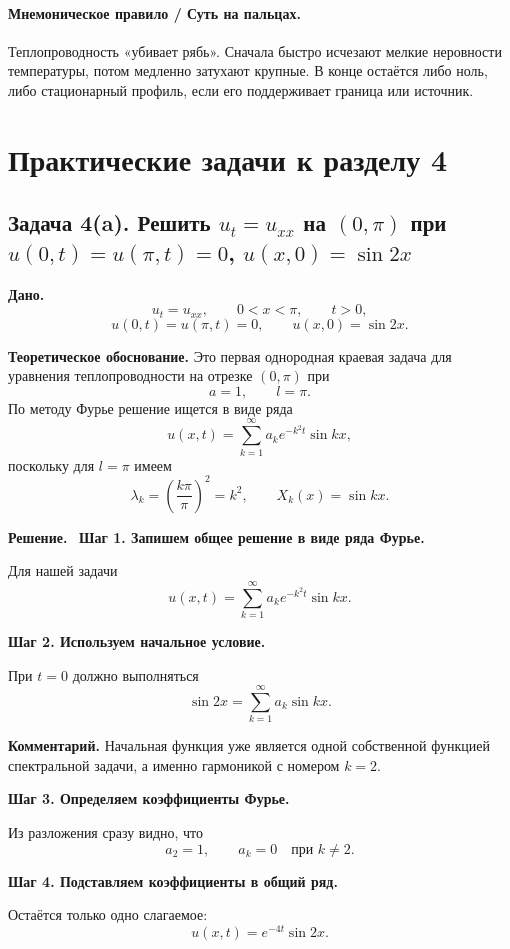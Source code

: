 \documentclass[a4paper,12pt]{article}
\newcommand{\Solution}{\textbf{Решение.}\ }
\begin{document}
\paragraph{Мнемоническое правило / Суть на пальцах.}
Теплопроводность «убивает рябь».
Сначала быстро исчезают мелкие неровности температуры,
потом медленно затухают крупные.
В конце остаётся либо ноль, либо стационарный профиль,
если его поддерживает граница или источник.

\section*{Практические задачи к разделу 4}

\subsection*{Задача 4(a). Решить \texorpdfstring{$u_t=u_{xx}$}{ut=uxx} на \texorpdfstring{$(0,\pi)$}{(0,pi)} при \texorpdfstring{$u(0,t)=u(\pi,t)=0$}{u(0,t)=u(pi,t)=0}, \texorpdfstring{$u(x,0)=\sin 2x$}{u(x,0)=sin 2x}}

\textbf{Дано.}
\[
u_t=u_{xx},
\qquad
0<x<\pi,
\qquad
t>0,
\]
\[
u(0,t)=u(\pi,t)=0,
\qquad
u(x,0)=\sin 2x.
\]

\textbf{Теоретическое обоснование.}
Это первая однородная краевая задача для уравнения теплопроводности на отрезке $(0,\pi)$ при
\[
a=1,
\qquad
l=\pi.
\]
По методу Фурье решение ищется в виде ряда
\[
u(x,t)=\sum_{k=1}^{\infty}a_ke^{-k^2t}\sin kx,
\]
поскольку для $l=\pi$ имеем
\[
\lambda_k=\left(\frac{k\pi}{\pi}\right)^2=k^2,
\qquad
X_k(x)=\sin kx.
\]

\Solution
\textbf{Шаг 1. Запишем общее решение в виде ряда Фурье.}

Для нашей задачи
\[
u(x,t)=\sum_{k=1}^{\infty}a_ke^{-k^2t}\sin kx.
\]

\textbf{Шаг 2. Используем начальное условие.}

При $t=0$ должно выполняться
\[
\sin 2x=\sum_{k=1}^{\infty}a_k\sin kx.
\]

\textbf{Комментарий.} Начальная функция уже является одной собственной функцией спектральной задачи, а именно гармоникой с номером $k=2$.

\textbf{Шаг 3. Определяем коэффициенты Фурье.}

Из разложения сразу видно, что
\[
a_2=1,
\qquad
a_k=0 \quad \text{при } k\ne 2.
\]

\textbf{Шаг 4. Подставляем коэффициенты в общий ряд.}

Остаётся только одно слагаемое:
\[
u(x,t)=e^{-4t}\sin 2x.
\]
\end{document}
